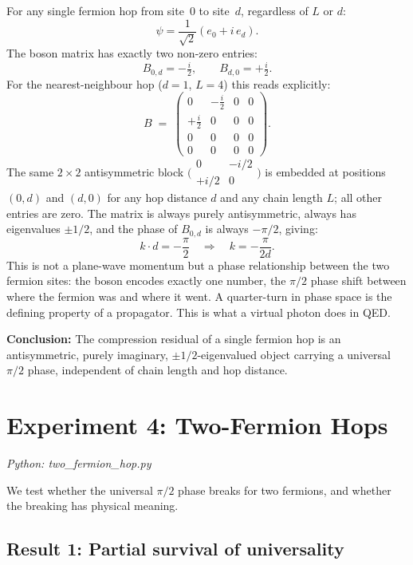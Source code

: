 \documentclass[11pt]{article}
\begin{document}
For any single fermion hop from site~$0$ to site~$d$, regardless of $L$ or $d$:
\[
  \psi = \frac{1}{\sqrt{2}}(e_0 + i\,e_d).
\]
The boson matrix has exactly two non-zero entries:
\[
  B_{0,d} = -\tfrac{i}{2}, \qquad B_{d,0} = +\tfrac{i}{2}.
\]
For the nearest-neighbour hop ($d=1$, $L=4$) this reads explicitly:
\[
  B \;=\;
  \begin{pmatrix}
    0 & -\tfrac{i}{2} & 0 & 0 \\[4pt]
    +\tfrac{i}{2} & 0 & 0 & 0 \\[4pt]
    0 & 0 & 0 & 0 \\[4pt]
    0 & 0 & 0 & 0
  \end{pmatrix}.
\]
The same $2\times 2$ antisymmetric block $\bigl(\begin{smallmatrix}0&-i/2\\+i/2&0\end{smallmatrix}\bigr)$
is embedded at positions $(0,d)$ and $(d,0)$ for any hop distance $d$ and
any chain length $L$; all other entries are zero.
The matrix is always purely antisymmetric, always has eigenvalues $\pm 1/2$,
and the phase of $B_{0,d}$ is always $-\pi/2$, giving:
\[
  k \cdot d = -\frac{\pi}{2}
  \quad\Longrightarrow\quad
  k = -\frac{\pi}{2d}.
\]
This is not a plane-wave momentum but a phase relationship between the two
fermion sites: the boson encodes exactly one number, the $\pi/2$ phase shift
between where the fermion was and where it went.
A quarter-turn in phase space is the defining property of a propagator.
This is what a virtual photon does in QED.

\textbf{Conclusion:} The compression residual of a single fermion hop is an
antisymmetric, purely imaginary, $\pm 1/2$-eigenvalued object carrying a
universal $\pi/2$ phase, independent of chain length and hop distance.

\section{Experiment 4: Two-Fermion Hops}
\label{sec:exp4}

\textit{Python: two\_fermion\_hop.py}

We test whether the universal $\pi/2$ phase breaks for two fermions, and
whether the breaking has physical meaning.

\subsection*{Result 1: Partial survival of universality}
\end{document}
